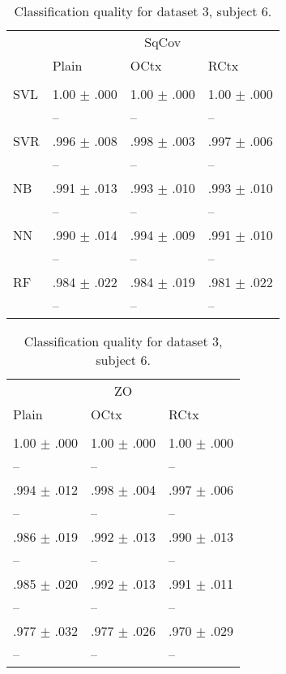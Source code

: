 \begin{table}[htb]
\renewcommand{\arraystretch}{0.6}
\centering
\footnotesize
\caption{Classification quality for dataset 3, subject 6.\label{table:Set3_patient6_res}}
\begin{tabular}{llll}
 & \multicolumn{3}{c}{SqCov} \\
 & Plain & OCtx & RCtx \\
 \cmidrule(lr){2-4}\\
SVL & 1.00 $\pm$ .000 & 1.00 $\pm$ .000 & 1.00 $\pm$ .000 \\
 & -- & -- & -- \\
SVR & .996 $\pm$ .008 & .998 $\pm$ .003 & .997 $\pm$ .006 \\
 & -- & -- & -- \\
NB & .991 $\pm$ .013 & .993 $\pm$ .010 & .993 $\pm$ .010 \\
 & -- & -- & -- \\
NN & .990 $\pm$ .014 & .994 $\pm$ .009 & .991 $\pm$ .010 \\
 & -- & -- & -- \\
RF & .984 $\pm$ .022 & .984 $\pm$ .019 & .981 $\pm$ .022 \\
 & -- & -- & -- \\
\end{tabular}%
\begin{tabular}{lll}
  \multicolumn{3}{c}{ZO} \\
  Plain & OCtx & RCtx \\
  \cmidrule(lr){1-3}\\
 1.00 $\pm$ .000 & 1.00 $\pm$ .000 & 1.00 $\pm$ .000 \\
  -- & -- & -- \\
 .994 $\pm$ .012 & .998 $\pm$ .004 & .997 $\pm$ .006 \\
  -- & -- & -- \\
 .986 $\pm$ .019 & .992 $\pm$ .013 & .990 $\pm$ .013 \\
  -- & -- & -- \\
 .985 $\pm$ .020 & .992 $\pm$ .013 & .991 $\pm$ .011 \\
  -- & -- & -- \\
 .977 $\pm$ .032 & .977 $\pm$ .026 & .970 $\pm$ .029 \\
  -- & -- & -- \\
\end{tabular}
\end{table}

